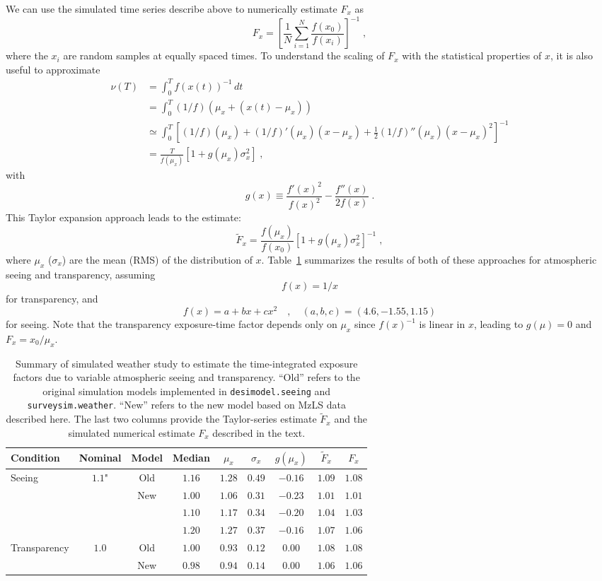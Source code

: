 \documentclass[12pt]{article}
\providecommand{\tab}[1]{Table~\ref{tab:#1}}
\begin{document}
We can use the simulated time series describe above to numerically estimate $F_x$ as
$$
F_x = \left[ \frac{1}{N} \sum_{i=1}^N \frac{f(x_0)}{f(x_i)}\right]^{-1} \; ,
$$
where the $x_i$ are random samples at equally spaced times. To understand the scaling of $F_x$ with the statistical properties of $x$, it is also useful to approximate
\begin{align*}
\nu(T) &= \int_0^T f(x(t))^{-1}\, dt \\
&= \int_0^T (1/f)\left(
\mu_x + (x(t) - \mu_x)\right) \\
&\simeq \int_0^T \left[ (1/f)(\mu_x) + (1/f)'(\mu_x) (x - \mu_x)
+ \frac{1}{2} (1/f)''(\mu_x) (x - \mu_x)^2 \right]^{-1} \\
&= \frac{T}{f(\mu_x)}\left[1 + g(\mu_x) \sigma_x^2 \right] \; ,
\end{align*}
with
$$
g(x) \equiv \frac{f'(x)^2}{f(x)^2} - \frac{f''(x)}{2 f(x)} \; .
$$
This Taylor expansion approach leads to the estimate:
$$
\tilde{F}_x = \frac{f(\mu_x)}{f(x_0)} \left[1 +
g(\mu_x) \sigma_x^2 \right]^{-1} \; ,
$$
where $\mu_x$ ($\sigma_x$) are the mean (RMS) of the distribution of $x$. \tab{expfac} summarizes the results of both of these approaches for atmospheric seeing and transparency, assuming
$$
f(x) = 1/x
$$
for transparency, and
$$
f(x) = a + b x + c x^2 \quad , \quad (a,b,c) = (4.6, -1.55, 1.15)
$$
for seeing.  Note that the transparency exposure-time factor depends only on $\mu_x$ since $f(x)^{-1}$ is linear in $x$, leading to $g(\mu) = 0$ and $F_x = x_0 / \mu_x$.

\begin{table}[htb]
\begin{center}
\begin{tabular}{lcccccccc}
Condition & Nominal & Model & Median & $\mu_x$ & $\sigma_x$ & $g(\mu_x)$ & $\tilde{F}_x$ & $F_x$ \\
\hline
Seeing & $1.1$" & Old & $1.16$ & $1.28$ & $0.49$ & $-0.16$ & $1.09$ & $1.08$ \\
              & & New & $1.00$ & $1.06$ & $0.31$ & $-0.23$ & $1.01$ & $1.01$ \\
              & &     & $1.10$ & $1.17$ & $0.34$ & $-0.20$ & $1.04$ & $1.03$ \\
              & &     & $1.20$ & $1.27$ & $0.37$ & $-0.16$ & $1.07$ & $1.06$ \\
\hline
Transparency & $1.0$ & Old & $1.00$ & $0.93$ & $0.12$ & $0.00$ & $1.08$ & $1.08$ \\
             &       & New & $0.98$ & $0.94$ & $0.14$ & $0.00$ & $1.06$ & $1.06$ \\
\hline
\end{tabular}
\caption{Summary of simulated weather study to estimate the time-integrated exposure factors due to variable atmospheric seeing and transparency.  ``Old'' refers to the original simulation models implemented in {\tt desimodel.seeing} and {\tt surveysim.weather}.  ``New'' refers to the new model based on MzLS data described here. The last two columns provide the Taylor-series estimate $\tilde{F}_x$ and the simulated numerical estimate $F_x$ described in the text.}
\label{tab:expfac}
\end{center}
\end{table}
\end{document}
